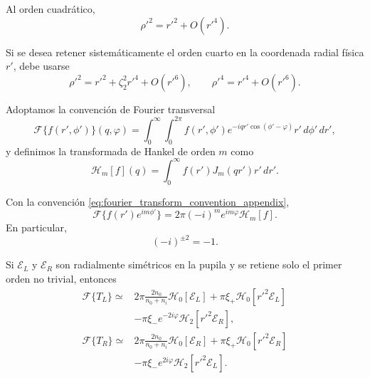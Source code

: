 Al orden cuadrático,
\begin{equation}
\rho'^2=r'^2+O(r'^4).
\label{eq:rho_prime_r_prime_second_order}
\end{equation}

Si se desea retener sistemáticamente el orden cuarto en la coordenada radial física \(r'\), debe usarse
\begin{equation}
\rho'^2
=
r'^2+\zeta_2^2r'^4+O(r'^6),
\qquad
\rho'^4
=
r'^4+O(r'^6).
\label{eq:rho_prime_r_prime_fourth_order}
\end{equation}

Adoptamos la convención de Fourier transversal
\begin{equation}
\mathscr F\{f(r',\phi')\}(q,\varphi)
=
\int_0^\infty
\int_0^{2\pi}
f(r',\phi')
e^{-iqr'\cos(\phi'-\varphi)}
r'\,d\phi'\,dr',
\label{eq:fourier_transform_convention_appendix}
\end{equation}
y definimos la transformada de Hankel de orden \(m\) como \cite{Watson1944}
\begin{equation}
\mathscr H_m[f](q)
=
\int_0^\infty
f(r')J_m(qr')r'\,dr'.
\label{eq:hankel_transform_definition_appendix}
\end{equation}

Con la convención \eqref{eq:fourier_transform_convention_appendix},
\begin{equation}
\mathscr F\{f(r')e^{im\phi'}\}
=
2\pi(-i)^m e^{im\varphi}\mathscr H_m[f].
\label{eq:fourier_hankel_angular_identity}
\end{equation}
En particular,
\begin{equation}
(-i)^{\pm2}=-1.
\label{eq:hankel_order_two_phase_factor}
\end{equation}

Si \(\mathscr E_L\) y \(\mathscr E_R\) son radialmente simétricos en la pupila y se retiene solo el primer orden no trivial, entonces
\begin{align}
\mathscr F\{T_L\}
\simeq{}&
2\pi
\frac{2n_0}{n_0+n_i}
\mathscr H_0[\mathscr E_L]
+
\pi
\xi_+
\mathscr H_0[r'^2\mathscr E_L]
\nonumber
\\[4pt]
&-
\pi
\xi_-
e^{-2i\varphi}
\mathscr H_2[r'^2\mathscr E_R],
\label{eq:FT_TL_paraxial_corrected}
\\[10pt]
\mathscr F\{T_R\}
\simeq{}&
2\pi
\frac{2n_0}{n_0+n_i}
\mathscr H_0[\mathscr E_R]
+
\pi
\xi_+
\mathscr H_0[r'^2\mathscr E_R]
\nonumber
\\[4pt]
&-
\pi
\xi_-
e^{2i\varphi}
\mathscr H_2[r'^2\mathscr E_L].
\label{eq:FT_TR_paraxial_corrected}
\end{align}

